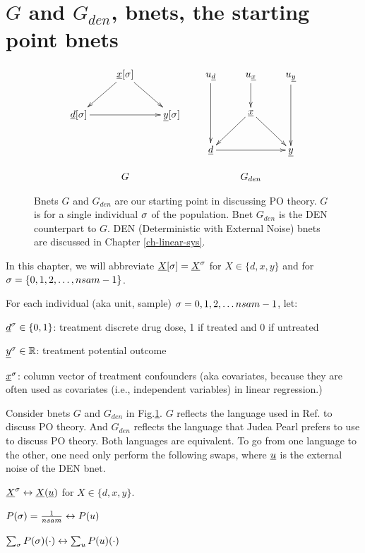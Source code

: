 \section{$G$ and $G_{den}$,
bnets,
the starting point bnets}


\begin{figure}[h!]
$$
\begin{array}{ccc}
\xymatrix{
&\rvx\sqsig\ar[dl]\ar[dr]
\\
\rvd\sqsig\ar[rr]&&\rvy\sqsig
}
&&
\xymatrix{
u_\rvd\ar[dd]&u_\rvx\ar[d]&u_\rvy\ar[dd]
\\
&\rvx\ar[dl]\ar[dr]
\\
\rvd\ar[rr]&&\rvy
}
\\
\\
G&&G_{den}
\end{array}
$$
\caption{Bnets
$G$ and $G_{den}$
are 
our starting
point in discussing PO theory. 
 $G$ is for 
a single individual $\sigma$ of the 
population.
Bnet $G_{den}$ is the 
DEN counterpart 
to $G$.
DEN (Deterministic with
External Noise) bnets are discussed in Chapter
\ref{ch-linear-sys}.} 
\label{fig-po-G-start}
\end{figure}

In this chapter, we will
abbreviate
${\underline{X}}{[\sigma]}={\underline{X}}^\sigma$
for
$X\in \{d, x, y\}$ 
and for $\sigma=\{0,1,2, \ldots, nsam-1\}$.


For each individual (aka unit, sample) 
$\sigma=0, 1, 2, \ldots nsam-1$, let:

${\underline{d}}^\sigma\in\{0,1\}$: treatment discrete drug dose,  1 if treated and 0 if untreated

${\underline{y}}^\sigma\in { \mathbb{R}}$:
 treatment potential outcome

${\underline{x}}^\sigma$: column vector of treatment 
confounders 
(aka covariates, because they
are often used as covariates (i.e., 
independent
variables) in linear regression.)

Consider bnets $G$ and $G_{den}$
in 
 Fig.\ref{fig-po-G-start}.
$G$ reflects the language
used in Ref.\cite{book-mixtape}
to discuss PO theory. And
$G_{den}$ reflects
the language that Judea Pearl 
prefers to use to discuss PO theory.
Both languages are equivalent. To go from
one language to the other, one need only
perform the following
swaps, where ${\underline{u}}$
is the external noise of the DEN bnet.

${\underline{X}}^\sigma\leftrightarrow {\underline{X}}({\underline{u}})$
for $X\in \{d, x, y\}$.

$P(\sigma)=\frac{1}{nsam}\leftrightarrow P(u)$

$\sum_\sigma P(\sigma) (\cdot)
\leftrightarrow \sum_uP(u) (\cdot)$




